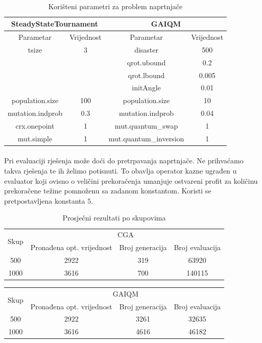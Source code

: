 \documentclass[times, utf8, zavrsni, numeric]{fer}
\begin{document}
\paragraph{}
\begin{table}[htb]
\caption{Korišteni parametri za problem naprtnjače}
\centering
\begin{tabular}{|c|c||c|c|} \hline
\multicolumn{2}{|c||}{SteadyStateTournament} & \multicolumn{2}{c|}{GAIQM} \\ 
\hline
Parametar & Vrijednost & Parametar & Vrijednost \\ 
\hline
tsize & 3 & disaster & 500 \\
&& qrot.ubound & 0.2 \\
&& qrot.lbound & 0.005 \\
&& initAngle & 0.01 \\
population.size & 100 & population.size & 10 \\
mutation.indprob & 0.3 & mutation.indprob & 0.04 \\
crx.onepoint & 1 & mut.quantum\_swap & 1 \\
mut.simple & 1 & mut.quantum\_inversion & 1 \\
\hline
\end{tabular}
\end{table}

\newpage

\paragraph{}
Pri evaluaciji rješenja može doći do pretrpavanja naprtnjače. Ne prihvaćamo takva rješenja te ih želimo potisnuti. To obavlja operator kazne ugrađen u evaluator koji ovisno o veličini prekoračenja umanjuje ostvareni profit za količinu prekoračene težine pomnoženu sa zadanom konstantom. Koristi se pretpostavljena konstanta $5$.

\newpage

\begin{table}[htb]
\caption{Prosječni rezultati po skupovima}
\centering
\begin{tabular}{|c|ccc|} \hline
\multirow{2}{*}{Skup} & \multicolumn{3}{c|}{CGA} \\ \cline{2-4}
 & Pronađena opt. vrijednost & Broj generacija & Broj evaluacija \\ 
\hline
500 & 2922 & 319 & 63920 \\
1000 & 3616 & 700 & 140115 \\
\hline
\end{tabular}
\end{table}
\begin{table}[htb]
\centering
\begin{tabular}{|c|ccc|} \hline
\multirow{2}{*}{Skup} & \multicolumn{3}{c|}{GAIQM} \\ \cline{2-4}
 & Pronađena opt. vrijednost & Broj generacija & Broj evaluacija \\ 
\hline
500 & 2922 & 3261 & 32635 \\
1000 & 3616 & 4616 & 46182 \\
\hline
\end{tabular}
\end{table}
\end{document}

